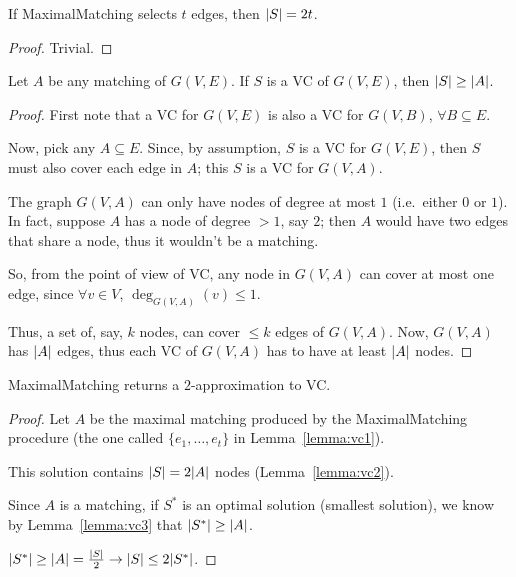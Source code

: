     \begin{lemma}\label{lemma:vc2}
        If MaximalMatching selects $t$ edges, then $\vert S \vert = 2t$.
    \end{lemma}

    \begin{proof}
        Trivial.
    \end{proof}

    \begin{lemma}\label{lemma:vc3}
        Let $A$ be any matching of $G(V,E)$. If $S$ is a VC of $G(V,E)$, then $\vert S \vert \geq \vert A \vert$.
    \end{lemma}

    \begin{proof}
        First note that a VC for $G(V,E)$ is also a VC for $G(V,B)$, $\forall B \subseteq E$.

        Now, pick any $A \subseteq E$. Since, by assumption, $S$ is a VC for $G(V,E)$, then $S$ must also cover each edge in $A$; this $S$ is a VC for $G(V,A)$.

        The graph $G(V,A)$ can only have nodes of degree at most $1$ (i.e.~either $0$ or $1$).
        In fact, suppose $A$ has a node of degree $>1$, say $2$; then $A$ would have two edges that share a node, thus it wouldn't be a matching.

        So, from the point of view of VC, any node in $G(V,A)$ can cover at most one edge, since $\forall v \in V$, $\deg_{G(V,A)}(v) \leq 1$.

        Thus, a set of, say, $k$ nodes, can cover $\leq k$ edges of $G(V,A)$. Now, $G(V,A)$ has $\vert A \vert$ edges, thus each VC of $G(V,A)$ has to have at least $\vert A \vert$ nodes.
    \end{proof}

    \begin{theorem}
        MaximalMatching returns a $2$-approximation to VC.\@
    \end{theorem}

    \begin{proof}
        Let $A$ be the maximal matching produced by the MaximalMatching procedure (the one called $\{ e_1, \dots, e_t \}$ in Lemma~\ref{lemma:vc1}).

        This solution contains $\vert S \vert = 2 \vert A \vert$ nodes (Lemma~\ref{lemma:vc2}).

        Since $A$ is a matching, if $S^*$ is an optimal solution (smallest solution), we know by Lemma~\ref{lemma:vc3} that $\vert S^* \vert \geq \vert A \vert$.

        $\vert S^* \vert \geq \vert A \vert = \frac{\vert S \vert}{2} \rightarrow \vert S \vert \leq 2 \vert S^* \vert$.
    \end{proof}

